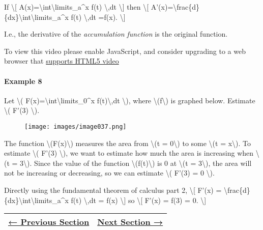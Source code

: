 If \textbackslash{}{[}
A(x)=\textbackslash{}int\textbackslash{}limits\_a\^{}x f(t)
\textbackslash{},dt \textbackslash{}{]} then \textbackslash{}{[}
A'(x)=\textbackslash{}frac\{d\}\{dx\}\textbackslash{}int\textbackslash{}limits\_a\^{}x
f(t) \textbackslash{},dt =f(x). \textbackslash{}{]}

I.e., the derivative of the \emph{accumulation function} is the original
function.

To view this video please enable JavaScript, and consider upgrading to a
web browser that \href{http://videojs.com/html5-video-support/}{supports
HTML5 video}

\hypertarget{example-8}{%
\paragraph{Example 8}\label{example-8}}

Let \textbackslash{}(
F(x)=\textbackslash{}int\textbackslash{}limits\_0\^{}x
f(t)\textbackslash{},dt \textbackslash{}), where
\textbackslash{}(f\textbackslash{}) is graphed below. Estimate
\textbackslash{}( F'(3) \textbackslash{}).

\begin{figure}
\centering
\texttt{[image: images/image037.png]}
\caption{}
\end{figure}

The function \textbackslash{}(F(x)\textbackslash{}) measures the area
from \textbackslash{}(t = 0\textbackslash{}) to some \textbackslash{}(t
= x\textbackslash{}). To estimate \textbackslash{}( F'(3)
\textbackslash{}), we want to estimate how much the area is increasing
when \textbackslash{}(t = 3\textbackslash{}). Since the value of the
function \textbackslash{}(f(t)\textbackslash{}) is 0 at
\textbackslash{}(t = 3\textbackslash{}), the area will not be increasing
or decreasing, so we can estimate \textbackslash{}( F'(3) = 0
\textbackslash{}).

Directly using the fundamental theorem of calculus part 2,
\textbackslash{}{[} F'(x) =
\textbackslash{}frac\{d\}\{dx\}\textbackslash{}int\textbackslash{}limits\_a\^{}x
f(t) \textbackslash{},dt = f(x) \textbackslash{}{]} so
\textbackslash{}{[} F'(x) = f(3) = 0. \textbackslash{}{]}

\begin{longtable}[]{@{}ll@{}}
\toprule
\endhead
\href{section3-1.php}{← Previous Section} & \href{section3-3.php}{Next
Section →}\tabularnewline
\bottomrule
\end{longtable}
